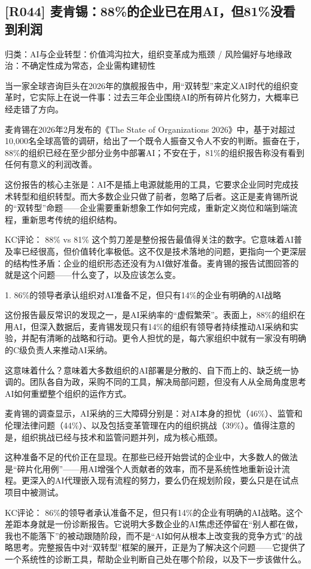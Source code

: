 \documentclass[11pt]{ctexart}
\begin{document}
\subsection{[R044] 麦肯锡：88\%的企业已在用AI，但81\%没看到利润}
{\small\color{refgray}归类：AI与企业转型：价值鸿沟拉大，组织变革成为瓶颈 / 风险偏好与地缘政治：不确定性成为常态，企业需构建韧性}

当一家全球咨询巨头在2026年的旗舰报告中，用“双转型”来定义AI时代的组织变革时，它实际上在说一件事：过去三年企业围绕AI的所有碎片化努力，大概率已经走错了方向。

麦肯锡在2026年2月发布的《The State of Organizations 2026》中，基于对超过10,000名全球高管的调研，给出了一个既令人振奋又令人不安的判断。振奋在于，88\%的组织已经在至少部分业务中部署AI；不安在于，81\%的组织报告称没有看到任何有意义的利润改善。

这份报告的核心主张是：AI不是插上电源就能用的工具，它要求企业同时完成技术转型和组织转型。而大多数企业只做了前者，忽略了后者。这正是麦肯锡所说的“双转型”命题——企业需要重新想象工作如何完成，重新定义岗位和端到端流程，重新思考传统的组织结构。

KC评论： 88\% vs 81\% 这个剪刀差是整份报告最值得关注的数字。它意味着AI普及率已经很高，但价值转化率极低。这不仅是技术落地的问题，更指向一个更深层的结构性矛盾：企业的组织形态还没有为AI做好准备。麦肯锡的报告试图回答的就是这个问题——什么变了，以及应该怎么变。

1. 86\%的领导者承认组织对AI准备不足，但只有14\%的企业有明确的AI战略

这份报告最反常识的发现之一，是AI采纳率的“虚假繁荣”。表面上，88\%的组织在用AI，但深入数据后，麦肯锡发现只有14\%的组织有领导者持续推动AI采纳和实验，并配有清晰的战略和行动。更令人担忧的是，每六家组织中就有一家没有明确的C级负责人来推动AI采纳。

这意味着什么？意味着大多数组织的AI部署是分散的、自下而上的、缺乏统一协调的。团队各自为政，采购不同的工具，解决局部问题，但没有人从全局角度思考AI如何重塑整个组织的运作方式。

麦肯锡的调查显示，AI采纳的三大障碍分别是：对AI本身的担忧（46\%）、监管和伦理法律问题（44\%）、以及包括变革管理在内的组织挑战（39\%）。值得注意的是，组织挑战已经与技术和监管问题并列，成为核心瓶颈。

这种准备不足的代价正在显现。在那些已经开始尝试的企业中，大多数人的做法是“碎片化用例”——用AI增强个人贡献者的效率，而不是系统性地重新设计流程。更深入的AI代理嵌入现有流程的努力，要么仍在规划阶段，要么只是在试点项目中被测试。

KC评论： 86\%的领导者承认准备不足，但只有14\%的企业有明确的AI战略。这个差距本身就是一份诊断报告。它说明大多数企业的AI焦虑还停留在“别人都在做，我也不能落下”的被动跟随阶段，而不是“AI如何从根本上改变我的竞争方式”的战略思考。完整报告中对“双转型”框架的展开，正是为了解决这个问题——它提供了一个系统性的诊断工具，帮助企业判断自己处在哪个阶段，以及下一步该做什么。
\end{document}
